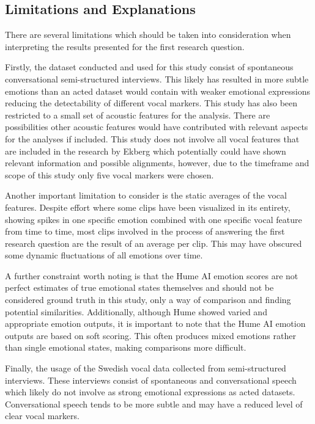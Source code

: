 \subsection{Limitations and Explanations}
There are several limitations which should be taken into consideration when interpreting the results presented for the first research question.

Firstly, the dataset conducted and used for this study consist of spontaneous conversational semi-structured interviews. This likely has resulted in more subtle emotions than an acted dataset would contain with weaker emotional expressions reducing the detectability of different vocal markers. 
This study has also been restricted to a small set of acoustic features for the analysis. There are possibilities other acoustic features would have contributed with relevant aspects for the analyses if included. This study does not involve all vocal features that are included in the research by Ekberg \autocite{Ekberg2023} which potentially could have shown relevant information and possible alignments, however, due to the timeframe and scope of this study only five vocal markers were chosen.

Another important limitation to consider is the static averages of the vocal features. Despite effort where some clips have been visualized in its entirety, showing spikes in one specific emotion combined with one specific vocal feature from time to time, most clips involved in the process of answering the first research question are the result of an average per clip. This may have obscured some dynamic fluctuations of all emotions over time.

A further constraint worth noting is that the Hume AI emotion scores are not perfect estimates of true emotional states themselves and should not be considered ground truth in this study, only a way of comparison and finding potential similarities. Additionally, although Hume showed varied and appropriate emotion outputs, it is important to note that the Hume AI emotion outputs are based on soft scoring. This often produces mixed emotions rather than single emotional states, making comparisons more difficult.

Finally, the usage of the Swedish vocal data collected from semi-structured interviews. These interviews consist of spontaneous and conversational speech which likely do not involve as strong emotional expressions as acted datasets. Conversational speech tends to be more subtle and may have a reduced level of clear vocal markers. 

